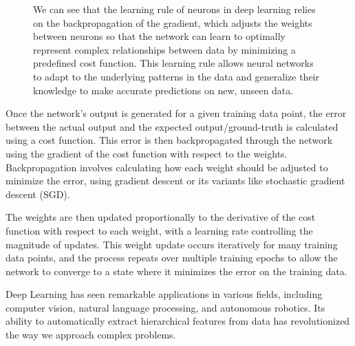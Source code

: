 \documentclass[11pt]{article}
\begin{document}
\begin{figure}[ht]
\begin{tikzpicture}[scale=0.8, font=\sffamily]
        \end{tikzpicture}
        \caption{We can see that the learning rule of neurons in deep learning relies on the backpropagation of the gradient, which adjusts the weights between neurons so that the network can learn to optimally represent complex relationships between data by minimizing a predefined cost function. This learning rule allows neural networks to adapt to the underlying patterns in the data and generalize their knowledge to make accurate predictions on new, unseen data.}
    \end{figure}

    Once the network's output is generated for a given training data point, the error between the actual output and the expected output/ground-truth is calculated using a cost function. This error is then backpropagated through the network using the gradient of the cost function with respect to the weights. Backpropagation involves calculating how each weight should be adjusted to minimize the error, using gradient descent or its variants like stochastic gradient descent (SGD).

    The weights are then updated proportionally to the derivative of the cost function with respect to each weight, with a learning rate controlling the magnitude of updates. This weight update occurs iteratively for many training data points, and the process repeats over multiple training epochs to allow the network to converge to a state where it minimizes the error on the training data.

    Deep Learning has seen remarkable applications in various fields, including computer vision, natural language processing, and autonomous robotics. Its ability to automatically extract hierarchical features from data has revolutionized the way we approach complex problems.
\end{document}
